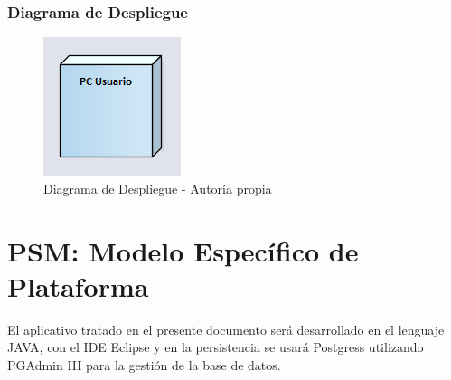 \subsubsection{Diagrama de Despliegue}

\begin{center}
    \begin{figure}[htb]
        \centering
        \includegraphics[width = 0.3\linewidth] {libro/capitulo5/img/Despliegue.PNG}
        \caption{Diagrama de Despliegue - Autor\'ia propia}
        \label{fig:my_label}
    \end{figure}
\end{center}

\section{PSM: Modelo Específico de Plataforma}

El aplicativo tratado en el presente documento ser\'a desarrollado en el lenguaje JAVA, con el IDE Eclipse y en la persistencia se usar\'a Postgress utilizando PGAdmin III para la gesti\'on de la base de datos.
